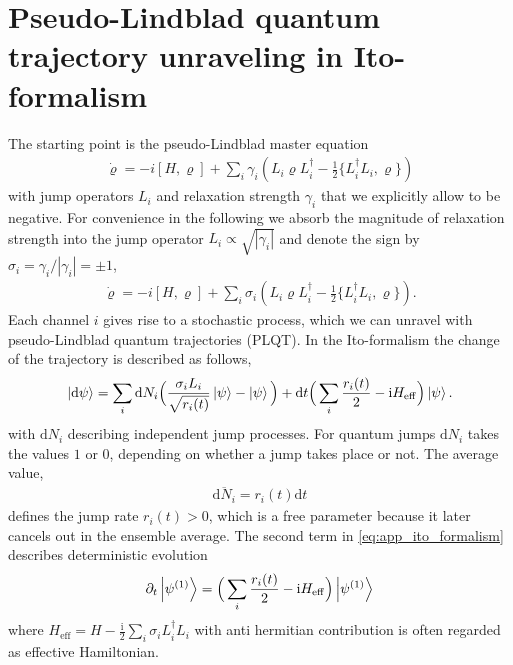 \documentclass[twocolumn,prl,superscriptaddress]{revtex4-2}
\renewcommand{\i}{\mathrm i}
\begin{document}
\section{Pseudo-Lindblad quantum trajectory unraveling in Ito-formalism}
The starting point is the pseudo-Lindblad master equation
\begin{align}
	\dot \varrho = -i[H, \varrho] + \sum\limits_{i} \gamma_i \left( L_i \varrho L_i^\dagger - \frac{1}{2} \{ L_i^\dagger L_i,\varrho \} \right) 
\end{align}
with jump operators $L_i$ and relaxation strength $\gamma_i$ that we explicitly allow to be negative. For convenience in the following we absorb the magnitude of relaxation strength into the jump operator $L_i \propto \sqrt{|\gamma_i|}$ and denote the sign by $\sigma_i=\gamma_i/|\gamma_i|=\pm 1$,
\begin{align}
	\dot \varrho = -i[H, \varrho] + \sum\limits_{i} \sigma_i \left( L_i \varrho L_i^\dagger - \frac{1}{2} \{ L_i^\dagger L_i,\varrho \} \right) .
	\label{eq:app_pseudo_lindblad}
\end{align}
Each channel $i$ gives rise to a stochastic process, which we can unravel with pseudo-Lindblad quantum trajectories (PLQT). In the Ito-formalism the change of the trajectory is described as follows,
\begin{align}
	\ket{ \mathrm d\psi} = \sum_i \mathrm d N_i \Big(\frac{\sigma_i L_i }{\sqrt{ r_i(t)}} \ket{\psi} - \ket \psi \Big) + \mathrm d t \Big( \sum_i \frac{ r_i(t)}{2} - \i H_\mathrm{eff} \Big) \ket \psi.
	\label{eq:app_ito_formalism}
\end{align}
with $\mathrm d N_i$ describing independent jump processes. For quantum jumps $\mathrm d N_i$ takes the values $1$ or $0$, depending on whether a jump takes place or not. The average value,
\begin{align}
	\overline{\mathrm d N_i} =  r_i(t) \mathrm d t
\end{align}
defines the jump rate $r_i(t)>0$, which is a free parameter because it later cancels out in the ensemble average. The second term in \cref{eq:app_ito_formalism} describes deterministic evolution 
\begin{align}
	\partial_t \ket{\psi^{(1)}} = \Big(\sum_i \frac{ r_i(t)}{2} - \i H_\mathrm{eff} \Big) \ket{\psi^{(1)}} 
	\label{eq:app_deterministic}
\end{align}
where $H_\mathrm{eff} = H - \frac{\i}{2} \sum_i \sigma_i L_i^\dagger L_i$ with anti hermitian contribution is often regarded as effective Hamiltonian. 
\end{document}
